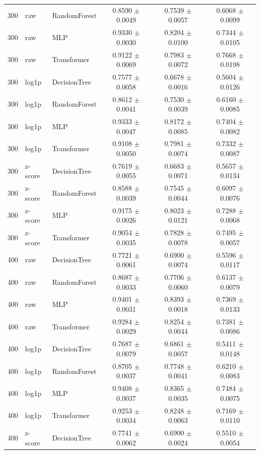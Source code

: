 \begin{longtable}{rllccc}
300 & raw & RandomForest & 0.8590 $\pm$ 0.0049 & 0.7539 $\pm$ 0.0057 & 0.6068 $\pm$ 0.0099 \\
300 & raw & MLP & 0.9330 $\pm$ 0.0030 & 0.8204 $\pm$ 0.0100 & 0.7344 $\pm$ 0.0105 \\
300 & raw & Transformer & 0.9122 $\pm$ 0.0069 & 0.7983 $\pm$ 0.0072 & 0.7668 $\pm$ 0.0198 \\
300 & log1p & DecisionTree & 0.7577 $\pm$ 0.0058 & 0.6678 $\pm$ 0.0016 & 0.5604 $\pm$ 0.0126 \\
300 & log1p & RandomForest & 0.8612 $\pm$ 0.0041 & 0.7530 $\pm$ 0.0039 & 0.6160 $\pm$ 0.0085 \\
300 & log1p & MLP & 0.9333 $\pm$ 0.0047 & 0.8172 $\pm$ 0.0085 & 0.7404 $\pm$ 0.0082 \\
300 & log1p & Transformer & 0.9108 $\pm$ 0.0050 & 0.7981 $\pm$ 0.0074 & 0.7332 $\pm$ 0.0087 \\
300 & z-score & DecisionTree & 0.7619 $\pm$ 0.0055 & 0.6683 $\pm$ 0.0071 & 0.5657 $\pm$ 0.0134 \\
300 & z-score & RandomForest & 0.8588 $\pm$ 0.0039 & 0.7545 $\pm$ 0.0044 & 0.6097 $\pm$ 0.0076 \\
300 & z-score & MLP & 0.9175 $\pm$ 0.0026 & 0.8023 $\pm$ 0.0121 & 0.7288 $\pm$ 0.0068 \\
300 & z-score & Transformer & 0.9054 $\pm$ 0.0035 & 0.7828 $\pm$ 0.0078 & 0.7495 $\pm$ 0.0057 \\
400 & raw & DecisionTree & 0.7721 $\pm$ 0.0061 & 0.6900 $\pm$ 0.0074 & 0.5596 $\pm$ 0.0117 \\
400 & raw & RandomForest & 0.8687 $\pm$ 0.0033 & 0.7706 $\pm$ 0.0060 & 0.6137 $\pm$ 0.0079 \\
400 & raw & MLP & 0.9401 $\pm$ 0.0031 & 0.8393 $\pm$ 0.0018 & 0.7369 $\pm$ 0.0133 \\
400 & raw & Transformer & 0.9284 $\pm$ 0.0029 & 0.8254 $\pm$ 0.0044 & 0.7381 $\pm$ 0.0086 \\
400 & log1p & DecisionTree & 0.7687 $\pm$ 0.0079 & 0.6861 $\pm$ 0.0057 & 0.5411 $\pm$ 0.0148 \\
400 & log1p & RandomForest & 0.8705 $\pm$ 0.0037 & 0.7748 $\pm$ 0.0041 & 0.6210 $\pm$ 0.0083 \\
400 & log1p & MLP & 0.9408 $\pm$ 0.0037 & 0.8365 $\pm$ 0.0035 & 0.7484 $\pm$ 0.0075 \\
400 & log1p & Transformer & 0.9253 $\pm$ 0.0034 & 0.8248 $\pm$ 0.0063 & 0.7169 $\pm$ 0.0110 \\
400 & z-score & DecisionTree & 0.7741 $\pm$ 0.0062 & 0.6900 $\pm$ 0.0024 & 0.5510 $\pm$ 0.0054 \\

\end{longtable}
